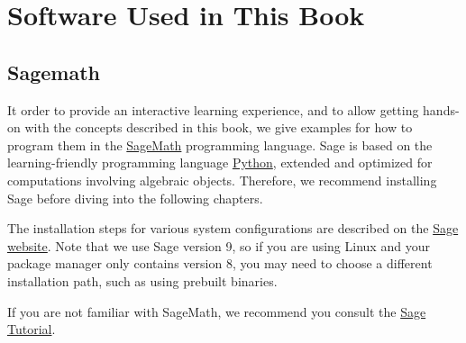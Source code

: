 \chapter{Software Used in This Book}

\section{Sagemath}
\label{sagemath_setup}
It order to provide an interactive learning experience, and to allow getting hands-on with the concepts described in this book, we give examples for how to program them in the \href{https://www.sagemath.org/}{SageMath} programming language. Sage is based on the learning-friendly programming language \href{https://www.python.org/}{Python},  extended and optimized for computations involving algebraic objects. Therefore, we recommend installing Sage before diving into the following chapters.

The installation steps for various system configurations are described on the \href{https://doc.sagemath.org/html/en/installation/index.html}{Sage website}. Note that we use Sage version 9, so if you are using Linux and your package manager only contains version 8, you may need to choose a different installation path, such as using prebuilt binaries.

If you are not familiar with SageMath, we recommend you consult the \href{https://doc.sagemath.org/html/en/tutorial/index.html}{Sage Tutorial}.




